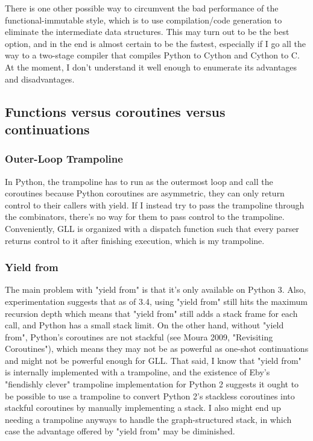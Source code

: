 \documentclass[12pt]{article}
\begin{document}
There is one other possible way to circumvent the bad performance of
the functional-immutable style, which is to use compilation/code
generation to eliminate the intermediate data structures.  This may
turn out to be the best option, and in the end is almost certain to be
the fastest, especially if I go all the way to a two-stage compiler
that compiles Python to Cython and Cython to C.  At the moment, I
don't understand it well enough to enumerate its advantages and
disadvantages.


\subsection{Functions versus coroutines versus continuations}
\label{sec:functions_coroutines_continuations}


\subsubsection{Outer-Loop Trampoline}
\label{sec:trampoline}

In Python, the trampoline has to run as the outermost loop and call
the coroutines because Python coroutines are asymmetric, they can only
return control to their callers with yield.  If I instead try to pass
the trampoline through the combinators, there's no way for them to
pass control to the trampoline.  Conveniently, GLL is organized with a
dispatch function such that every parser returns control to it after
finishing execution, which is my trampoline.


\subsubsection{Yield from}
\label{sec:yield_from}

The main problem with "yield from" is that it's only available on
Python 3.  Also, experimentation suggests that as of 3.4, using "yield
from" still hits the maximum recursion depth which means that "yield
from" still adds a stack frame for each call, and Python has a small
stack limit.  On the other hand, without "yield from", Python's
coroutines are not stackful (see Moura 2009, "Revisiting Coroutines"),
which means they may not be as powerful as one-shot continuations and
might not be powerful enough for GLL.  That said, I know that "yield
from" is internally implemented with a trampoline, and the existence
of Eby's "fiendishly clever" trampoline implementation for Python 2
suggests it ought to be possible to use a trampoline to convert Python
2's stackless coroutines into stackful coroutines by manually
implementing a stack.  I also might end up needing a trampoline
anyways to handle the graph-structured stack, in which case the
advantage offered by "yield from" may be diminished.
\end{document}
